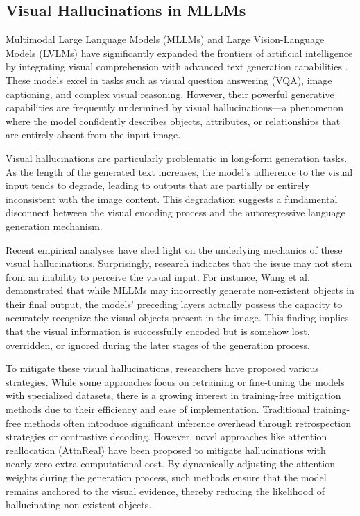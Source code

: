\documentclass[11pt,a4paper]{article}
\begin{document}
\subsection{Visual Hallucinations in MLLMs}

Multimodal Large Language Models (MLLMs) and Large Vision-Language Models (LVLMs) have significantly expanded the frontiers of artificial intelligence by integrating visual comprehension with advanced text generation capabilities \cite{Morbiato_2025_Grounded}. These models excel in tasks such as visual question answering (VQA), image captioning, and complex visual reasoning. However, their powerful generative capabilities are frequently undermined by visual hallucinations---a phenomenon where the model confidently describes objects, attributes, or relationships that are entirely absent from the input image.

Visual hallucinations are particularly problematic in long-form generation tasks. As the length of the generated text increases, the model's adherence to the visual input tends to degrade, leading to outputs that are partially or entirely inconsistent with the image content. This degradation suggests a fundamental disconnect between the visual encoding process and the autoregressive language generation mechanism.

Recent empirical analyses have shed light on the underlying mechanics of these visual hallucinations. Surprisingly, research indicates that the issue may not stem from an inability to perceive the visual input. For instance, Wang et al. demonstrated that while MLLMs may incorrectly generate non-existent objects in their final output, the models' preceding layers actually possess the capacity to accurately recognize the visual objects present in the image. This finding implies that the visual information is successfully encoded but is somehow lost, overridden, or ignored during the later stages of the generation process.

To mitigate these visual hallucinations, researchers have proposed various strategies. While some approaches focus on retraining or fine-tuning the models with specialized datasets, there is a growing interest in training-free mitigation methods due to their efficiency and ease of implementation. Traditional training-free methods often introduce significant inference overhead through retrospection strategies or contrastive decoding. However, novel approaches like attention reallocation (AttnReal) have been proposed to mitigate hallucinations with nearly zero extra computational cost. By dynamically adjusting the attention weights during the generation process, such methods ensure that the model remains anchored to the visual evidence, thereby reducing the likelihood of hallucinating non-existent objects.
\end{document}

